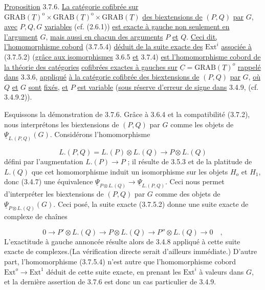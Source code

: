 \underline{Proposition} 3.7.6. \underline{La catégorie cofibrée sur} $\mathrm{GRAB}(\underline{T})^{\mathrm{o}} \times \mathrm{GRAB}(\underline{T})^{\mathrm{o}} \times \mathrm{GRAB}(\underline{T})$ \underline{des biextensions de} $(P,Q)$ \underline{par} $G$, \underline{avec} $P,Q,G$ \underline{variables} (cf. (2.6.1)) \underline{est exacte à gauche non seulement en l'argument} $G$, \underline{mais aussi en chacun des arguments} $P$ \underline{et} $Q$. \underline{Ceci dit,} \underline{l'homomorphisme cobord} (3.7.5.4) \underline{déduit de la suite exacte des} $\mathrm{Ext}^{i}$ \underline{associée à} (3.7.5.2) (\underline{grâce aux isomorphismes} 3.6.5 \underline{et} 3.7.4) \underline{est l'homomorphisme cobord de la théorie des catégories}
\underline{cofibrées exactes à gauches sur} $\underline{C} = \mathrm{GRAB}(\underline{T})^{o}$ \underline{rappelé dans} 3.3.6, \underline{appliqué} \underline{à la catégorie cofibrée des biextensions de} $(P,Q)$ \underline{par} $G$, \underline{où} $Q$ \underline{et} $G$ \underline{sont} \underline{fixés}, \underline{et} $P$ \underline{est variable} (\underline{sous réserve d'erreur de signe dans} 3.4.9, (cf. 3.4.9.2)).

Esquissons la démonstration de 3.7.6. Grâce à 3.6.4 et la compatibilité (3.7.2), nous interprétons les biextensions de $(P,Q)$ par $G$ comme les objets de $\underline{\Psi}_{L.(P,Q)}(G)$. Considérons l'homomorphisme

\begin{equation*}
L.(P,Q)=L.(P) \otimes L.(Q) \longrightarrow P \otimes L.(Q)
\end{equation*}
défini par l'augmentation $L.(P) \longrightarrow P$ ; il résulte de 3.5.3 et de la platitude de $L.(Q)$ que cet homomorphisme induit un isomorphisme sur les objets $H_o$ et $H_1$, donc (3.4.7) une équivalence $\underline{\Psi}_{P \otimes L.(Q)} \longrightarrow \underline{\Psi}_{L.(P,Q)}$. Ceci nous permet d'interpréter les biextensions de $(P,Q)$ par $G$ comme des objets de $\underline{\Psi}_{P \otimes L.(Q)}(G)$. Ceci posé, la suite exacte (3.7.5.2) donne une suite exacte de complexe de chaînes

\begin{equation}\tag{3.7.6.1}
0 \longrightarrow P' \otimes L.(Q) \longrightarrow P \otimes L.(Q) \longrightarrow P'' \otimes L.(Q) \longrightarrow 0 \quad ,
\end{equation}
L'exactitude à gauche annoncée résulte alors de 3.4.8 appliqué à cette suite exacte de complexes.(La vérification directe serait d'ailleurs immédiate.) D'autre part, l'homomorphisme (3.7.5.4) n'est autre que l'homomorphisme cobord $\mathrm{Ext}^{o} \longrightarrow \mathrm{Ext}^{1}$ déduit de cette suite exacte, en prenant les $\mathrm{Ext}^{i}$ à valeurs dans $G$, et la dernière assertion de 3.7.6 est donc un cas particulier de 3.4.9.


